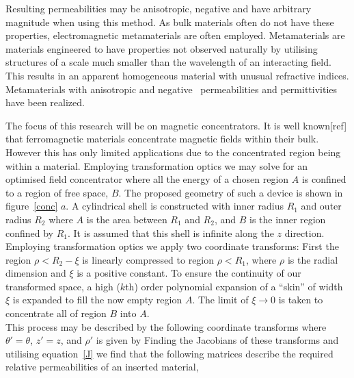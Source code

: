 \documentclass[11pt]{iopart}
\begin{document}
\noindent Resulting permeabilities may be anisotropic, negative and
have arbitrary magnitude when using this method. As bulk materials
often do not have these properties, electromagnetic metamaterials are
often employed.  Metamaterials are materials engineered to have
properties not observed naturally by utilising structures of a scale
much smaller than the wavelength of an interacting field. This results
in an apparent homogeneous material with unusual refractive
indices. Metamaterials with anisotropic and negative~\cite{Pendry2000}
permeabilities and permittivities have been realized.

The focus of this research will be on magnetic concentrators. It is
well known[ref] that ferromagnetic materials concentrate magnetic
fields within their bulk. However this has only limited applications
due to the concentrated region being within a material.
Employing
transformation optics we may solve for an optimised field concentrator
where all the energy of a chosen region $A$ is confined to a
region of free space, $B$. The proposed geometry of such a device is
shown in figure~\ref{conc} $a$.
A cylindrical shell is constructed with inner radius $R_1$ and outer
radius $R_2$ where $A$ is the area between $R_1$ and $R_2$, and $B$ is
the inner region confined by $R_1$. It is assumed that this shell is
infinite along the $z$ direction.  Employing transformation optics we
apply two coordinate transforms: First the region $\rho < R_2 - \xi$
is linearly compressed to region $\rho < R_1$, where $\rho$ is the
radial dimension and $\xi$ is a positive constant.  To ensure the
continuity of our transformed space, a high ($k$th) order polynomial
expansion of a ``skin'' of width $\xi$ is expanded to fill the now
empty region $A$. The limit of $\xi \rightarrow 0$ is taken to
concentrate all of region $B$ into $A$. \\
This process may be described by the following coordinate transforms
where $\theta' = \theta$, $z' = z$, and $\rho'$ is given by
Finding the Jacobians of these transforms and utilising
equation~\ref{J} we find that the following matrices describe the
required relative permeabilities of an inserted material,
\end{document}
